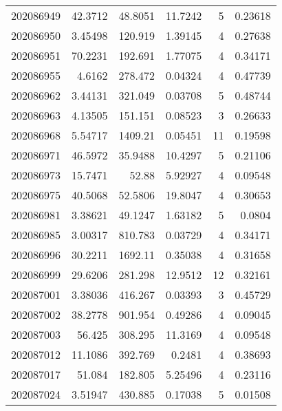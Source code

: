 \begin{tabular}{rrrrrr}
 202086949 &         42.3712  &       48.8051 &           11.7242  &           5 & 0.23618 \\
 202086950 &          3.45498 &      120.919  &            1.39145 &           4 & 0.27638 \\
 202086951 &         70.2231  &      192.691  &            1.77075 &           4 & 0.34171 \\
 202086955 &          4.6162  &      278.472  &            0.04324 &           4 & 0.47739 \\
 202086962 &          3.44131 &      321.049  &            0.03708 &           5 & 0.48744 \\
 202086963 &          4.13505 &      151.151  &            0.08523 &           3 & 0.26633 \\
 202086968 &          5.54717 &     1409.21   &            0.05451 &          11 & 0.19598 \\
 202086971 &         46.5972  &       35.9488 &           10.4297  &           5 & 0.21106 \\
 202086973 &         15.7471  &       52.88   &            5.92927 &           4 & 0.09548 \\
 202086975 &         40.5068  &       52.5806 &           19.8047  &           4 & 0.30653 \\
 202086981 &          3.38621 &       49.1247 &            1.63182 &           5 & 0.0804  \\
 202086985 &          3.00317 &      810.783  &            0.03729 &           4 & 0.34171 \\
 202086996 &         30.2211  &     1692.11   &            0.35038 &           4 & 0.31658 \\
 202086999 &         29.6206  &      281.298  &           12.9512  &          12 & 0.32161 \\
 202087001 &          3.38036 &      416.267  &            0.03393 &           3 & 0.45729 \\
 202087002 &         38.2778  &      901.954  &            0.49286 &           4 & 0.09045 \\
 202087003 &         56.425   &      308.295  &           11.3169  &           4 & 0.09548 \\
 202087012 &         11.1086  &      392.769  &            0.2481  &           4 & 0.38693 \\
 202087017 &         51.084   &      182.805  &            5.25496 &           4 & 0.23116 \\
 202087024 &          3.51947 &      430.885  &            0.17038 &           5 & 0.01508 \\

\end{tabular}
